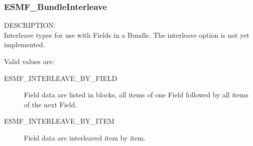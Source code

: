 

\subsubsection{ESMF\_BundleInterleave}
\label{opt:bundleinterleave}
{\sf DESCRIPTION:\\}
Interleave types for use with Fields in a Bundle.  The interleave option 
is not yet implemented.

Valid values are:
\begin{description}
   \item [ESMF\_INTERLEAVE\_BY\_FIELD]
         Field data are listed in blocks, all items of one Field followed
         by all items of the next Field.
   \item [ESMF\_INTERLEAVE\_BY\_ITEM]
         Field data are interleaved item by item.
\end{description}





